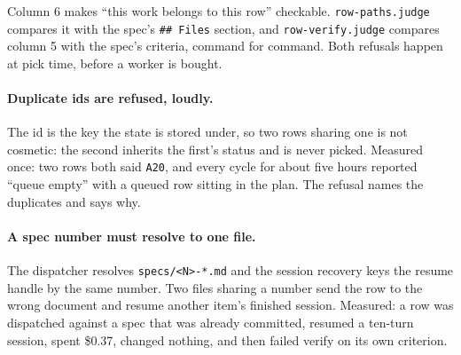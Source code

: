 Column 6 makes ``this work belongs to this row'' checkable. \texttt{row-paths.judge} compares
it with the spec's \texttt{\#\# Files} section, and \texttt{row-verify.judge} compares column
5 with the spec's criteria, command for command. Both refusals happen at pick time, before a
worker is bought.

\paragraph{Duplicate ids are refused, loudly.} The id is the key the state is stored under, so
two rows sharing one is not cosmetic: the second inherits the first's status and is never
picked. Measured once: two rows both said \texttt{A20}, and every cycle for about five hours
reported ``queue empty'' with a queued row sitting in the plan. The refusal names the
duplicates and says why.

\paragraph{A spec number must resolve to one file.} The dispatcher resolves
\texttt{specs/<N>-*.md} and the session recovery keys the resume handle by the same number.
Two files sharing a number send the row to the wrong document and resume another item's
finished session. Measured: a row was dispatched against a spec that was already committed,
resumed a ten-turn session, spent \$0.37, changed nothing, and then failed verify on its own
criterion.

\begin{center}
\end{center}


